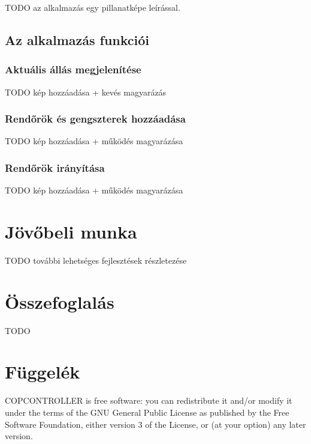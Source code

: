 \documentclass[a4paper,12pt]{report}
\begin{document}
TODO az alkalmazás egy pillanatképe leírással.


\section{Az alkalmazás funkciói}
\label{functions}


\subsection{Aktuális állás megjelenítése}
\label{actualstate}

TODO kép hozzáadása + kevés magyarázás

\subsection{Rendőrök és gengszterek hozzáadása}
\label{addcops}

TODO kép hozzáadása + működés magyarázása

\subsection{Rendőrök irányítása}
\label{controlcops}

TODO kép hozzáadása + működés magyarázása

\newpage
\chapter{Jövőbeli munka}
\label{futureworks}

TODO további lehetséges fejlesztések részletezése

\newpage
\chapter{Összefoglalás}
\label{summary}

TODO

\newpage
{}

\begin{singlespace}

\end{singlespace}

\chapter*{Függelék}

\noindent
COPCONTROLLER is free software: you can redistribute it and/or modify
it under the terms of the GNU General Public License as published by
the Free Software Foundation, either version 3 of the License, or
(at your option) any later version.
\end{document}
